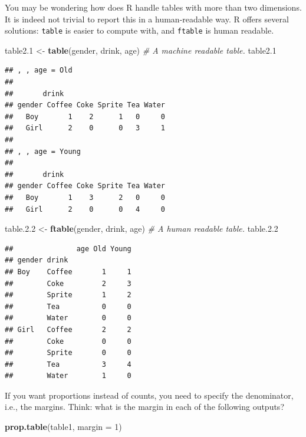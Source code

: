 \documentclass[]{book}
\newenvironment{Shaded}{\begin{snugshade}}{\end{snugshade}}
\newcommand{\KeywordTok}[1]{\textcolor[rgb]{0.13,0.29,0.53}{\textbf{#1}}}
\newcommand{\DataTypeTok}[1]{\textcolor[rgb]{0.13,0.29,0.53}{#1}}
\newcommand{\DecValTok}[1]{\textcolor[rgb]{0.00,0.00,0.81}{#1}}
\newcommand{\FloatTok}[1]{\textcolor[rgb]{0.00,0.00,0.81}{#1}}
\newcommand{\StringTok}[1]{\textcolor[rgb]{0.31,0.60,0.02}{#1}}
\newcommand{\CommentTok}[1]{\textcolor[rgb]{0.56,0.35,0.01}{\textit{#1}}}
\newcommand{\NormalTok}[1]{#1}
\theoremstyle{definition}
\theoremstyle{definition}
\theoremstyle{definition}
\theoremstyle{remark}
\begin{document}
You may be wondering how does R handle tables with more than two
dimensions. It is indeed not trivial to report this in a human-readable
way. R offers several solutions: \texttt{table} is easier to compute
with, and \texttt{ftable} is human readable.

\begin{Shaded}
\begin{Highlighting}[]
\NormalTok{table2.}\DecValTok{1}\NormalTok{ <-}\StringTok{ }\KeywordTok{table}\NormalTok{(gender, drink, age) }\CommentTok{# A machine readable table. }
\NormalTok{table2.}\DecValTok{1}
\end{Highlighting}
\end{Shaded}

\begin{verbatim}
## , , age = Old
## 
##       drink
## gender Coffee Coke Sprite Tea Water
##   Boy       1    2      1   0     0
##   Girl      2    0      0   3     1
## 
## , , age = Young
## 
##       drink
## gender Coffee Coke Sprite Tea Water
##   Boy       1    3      2   0     0
##   Girl      2    0      0   4     0
\end{verbatim}

\begin{Shaded}
\begin{Highlighting}[]
\NormalTok{table.}\FloatTok{2.2}\NormalTok{ <-}\StringTok{ }\KeywordTok{ftable}\NormalTok{(gender, drink, age) }\CommentTok{# A human readable table.}
\NormalTok{table.}\FloatTok{2.2}
\end{Highlighting}
\end{Shaded}

\begin{verbatim}
##               age Old Young
## gender drink               
## Boy    Coffee       1     1
##        Coke         2     3
##        Sprite       1     2
##        Tea          0     0
##        Water        0     0
## Girl   Coffee       2     2
##        Coke         0     0
##        Sprite       0     0
##        Tea          3     4
##        Water        1     0
\end{verbatim}

If you want proportions instead of counts, you need to specify the
denominator, i.e., the margins. Think: what is the margin in each of the
following outputs?

\begin{Shaded}
\begin{Highlighting}[]
\KeywordTok{prop.table}\NormalTok{(table1, }\DataTypeTok{margin =} \DecValTok{1}\NormalTok{)}
\end{Highlighting}
\end{Shaded}
\end{document}
